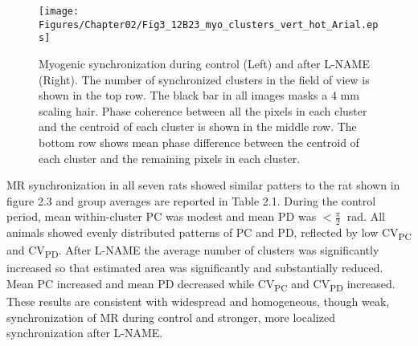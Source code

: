\begin{figure}[H]
\begin{center}
\texttt{[image: Figures/Chapter02/Fig3\_12B23\_myo\_clusters\_vert\_hot\_Arial.eps]}
\caption[Myogenic synchronization before and after L-NAME]{Myogenic synchronization during control (Left) and after L-NAME (Right). The number of synchronized clusters in the field of view is shown in the top row. The black bar in all images masks a 4 mm scaling hair. Phase coherence between all the pixels in each cluster and the centroid of each cluster is shown in the middle row. The bottom row shows mean phase difference between the centroid of each cluster and the remaining pixels in each cluster.}
\end{center}
\end{figure}

	MR synchronization in all seven rats showed similar patters to the rat shown in figure 2.3 and group averages are reported in Table 2.1. During the control period, mean within-cluster PC was modest and mean PD was $<\frac{\pi}{2} \ $ rad. All animals showed evenly distributed patterns of PC and PD, reflected by low CV\textsubscript{PC} and CV\textsubscript{PD}. After L-NAME the average number of clusters was significantly increased so that estimated area was significantly and substantially reduced. Mean PC increased and mean PD decreased while CV\textsubscript{PC} and CV\textsubscript{PD} increased. These results are consistent with widespread and homogeneous, though weak, synchronization of MR during control and stronger, more localized synchronization after L-NAME.


